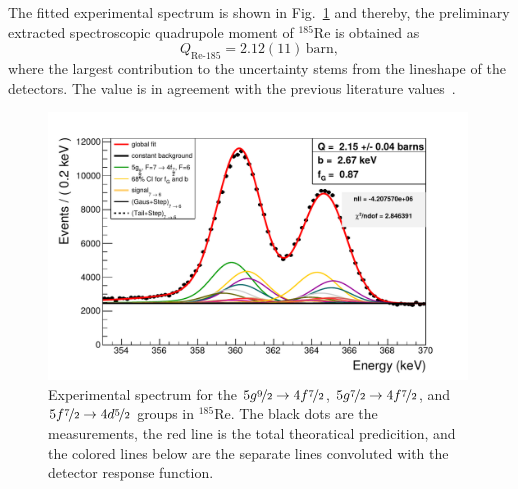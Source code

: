 The fitted experimental spectrum is shown in Fig.~\ref{fig:re54} and thereby, the preliminary extracted spectroscopic quadrupole moment of $^{185}$Re is obtained as
\begin{equation}
Q_{\text{Re-}185} = 2.12(11)\,\text{barn},
\end{equation}
where the largest contribution to the uncertainty stems from the lineshape of the detectors. The value is in agreement with the previous literature values~\cite{Stone2005}.

\begin{figure}%
\centering
\includegraphics[width=0.99\textwidth]{pics/Re185_Exp}
\caption{
Experimental spectrum for the $5g\nicefrac{9}{2}\rightarrow4f\nicefrac{7}{2}$, $5g\nicefrac{7}{2}\rightarrow4f\nicefrac{7}{2}$, and $5f\nicefrac{7}{2}\rightarrow4d\nicefrac{5}{2}$ groups in $^{185}$Re. The black dots are the measurements, the red line is the total theoratical predicition, and the colored lines below are the separate lines convoluted with the detector response function.
}
\label{fig:re54}
\end{figure}
%
%
%
%
